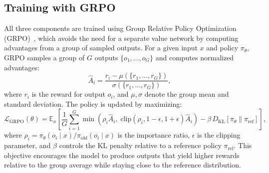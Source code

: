 \subsection{Training with GRPO}
All three components are trained using Group Relative Policy Optimization (GRPO)~, which avoids the need for a separate value network by computing advantages from a group of sampled outputs. For a given input $x$ and policy $\pi_\theta$, GRPO samples a group of $G$ outputs $\{o_1, \ldots, o_G\}$ and computes normalized advantages:
\begin{equation}
\hat{A}_i = \frac{r_i - \mu(\{r_1, \ldots, r_G\})}{\sigma(\{r_1, \ldots, r_G\})},
\end{equation}
where $r_i$ is the reward for output $o_i$, and $\mu, \sigma$ denote the group mean and standard deviation. The policy is updated by maximizing:
\begin{equation}
\mathcal{L}_{\text{GRPO}}(\theta) = \mathbb{E}_{x} \left[ \frac{1}{G} \sum_{i=1}^{G} \min\!\left( \rho_i \hat{A}_i, \; \text{clip}(\rho_i, 1{-}\epsilon, 1{+}\epsilon) \hat{A}_i \right) - \beta \, D_{\text{KL}}\!\left[\pi_\theta \| \pi_{\text{ref}}\right] \right],
\end{equation}
where $\rho_i = \pi_\theta(o_i \mid x) / \pi_{\text{old}}(o_i \mid x)$ is the importance ratio, $\epsilon$ is the clipping parameter, and $\beta$ controls the KL penalty relative to a reference policy $\pi_{\text{ref}}$. This objective encourages the model to produce outputs that yield higher rewards relative to the group average while staying close to the reference distribution.
